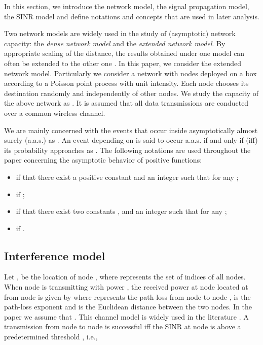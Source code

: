 \documentclass[english]{IEEEtran}
\theoremstyle{plain}
\theoremstyle{plain}
\theoremstyle{plain}
\theoremstyle{remark}
\begin{document}
In this section, we introduce the network model, the signal propagation
model, the SINR model and define notations and concepts that are used
in later analysis.

Two network models are widely used in the study of (asymptotic) network
capacity: the \emph{dense network model} and the \emph{extended network
model}. By appropriate scaling of the distance, the results obtained
under one model can often be extended to the other one \cite{Franceschetti07Random}.
In this paper, we consider the extended network model. Particularly
we consider a network with nodes deployed on a 
box  according to a Poisson point process with
unit intensity. Each node chooses its destination randomly and independently
of other nodes. We study the capacity of the above network as .
It is assumed that all data transmissions are conducted over a common
wireless channel.

We are mainly concerned with the events that occur inside 
asymptotically almost surely (a.a.s.) as . An
event  depending on  is said to occur a.a.s. if and
only if (iff) its probability approaches  as .
The following notations are used throughout the paper concerning the
asymptotic behavior of positive functions:
\begin{itemize}
\item  if that there exist
a positive constant  and an integer  such that 
for any ;
\item  if ;
\item  if that there
exist two constants ,  and an integer  such
that 
for any ;
\item  if .
\end{itemize}

\subsection{Interference model\label{sub:Interference-model}}

Let , be the location of node ,
where  represents the set of indices of all nodes. When node
 is transmitting with power , the received power at node
 located at  from node  is given by 
where 
represents the path-loss from node  to node ,  is
the path-loss exponent and 
is the Euclidean distance between the two nodes. In the paper we assume
that . This channel model is widely used in the literature
\cite{Haenggi09Interference,Franceschetti07Closing,Gupta00Capacity,Chau11Capacity}.
A transmission from node  to node  is successful iff the SINR
at node  is above a predetermined threshold , i.e.,
\end{document}
